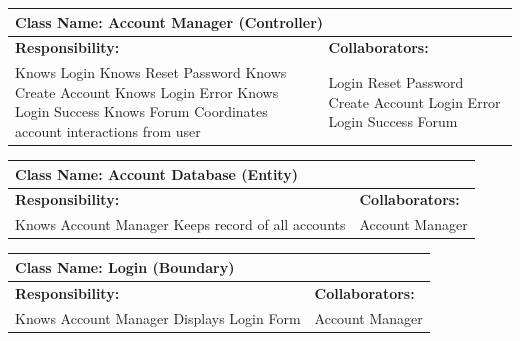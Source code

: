 \documentclass[]{article}
\begin{document}
	\begin{table}[H]
	    \centering
	    \begin{tabular}{|p{7cm}|p{7cm}|}
	    \hline 
	     \multicolumn{2}{|l|}{\textbf{Class Name: Account Manager (Controller)}} \\
	    \hline
	    \textbf{Responsibility:} & \textbf{Collaborators:} \\
	    \hline
		Knows Login \newline
		Knows Reset Password \newline
		Knows Create Account \newline
		Knows Login Error \newline
		Knows Login Success \newline
		Knows Forum \newline
		Coordinates account interactions from user & 		
	    Login \newline
		Reset Password \newline
		Create Account \newline
		Login Error \newline
		Login Success \newline
		Forum \\
	    \hline
	    \end{tabular}
	\end{table}

	\begin{table}[H]
	    \centering
	    \begin{tabular}{|p{7cm}|p{7cm}|}
	    \hline 
	     \multicolumn{2}{|l|}{\textbf{Class Name: Account Database (Entity)}} \\
	    \hline
	    \textbf{Responsibility:} & \textbf{Collaborators:} \\
	    \hline
	    Knows Account Manager \newline
		Keeps record of all accounts & 		
	    Account Manager \\
	    \hline
	    \end{tabular}
	\end{table}

	\begin{table}[H]
	    \centering
	    \begin{tabular}{|p{7cm}|p{7cm}|}
	    \hline 
	     \multicolumn{2}{|l|}{\textbf{Class Name: Login (Boundary)}} \\
	    \hline
	    \textbf{Responsibility:} & \textbf{Collaborators:} \\
	    \hline
	    Knows Account Manager \newline
		Displays Login Form & 
		Account Manager \\
	    \hline
	    \end{tabular}
	\end{table}
\end{document}
